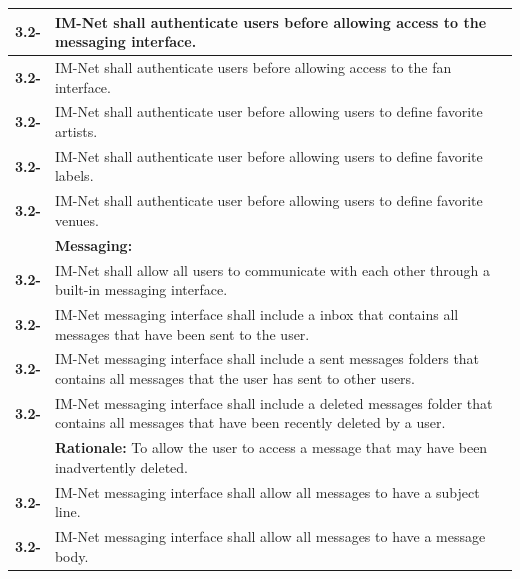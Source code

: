 \documentclass[letterpaper,12pt]{article}
\newcounter{rcounter}						%
\newcommand\rnumber{\stepcounter{rcounter}\arabic{rcounter}}
\begin{document}
{\begin{center}
\begin{tabular}{|l|p{6in}|}
\hline 
\textbf{3.2-\rnumber} & IM-Net shall authenticate users before allowing access to the messaging interface. \\ 
\hline 
\textbf{3.2-\rnumber} & IM-Net shall authenticate users before allowing access to the fan interface. \\ 
\hline 
\textbf{3.2-\rnumber} & IM-Net shall authenticate user before allowing users to define favorite artists. \\ 
\hline 
\textbf{3.2-\rnumber} & IM-Net shall authenticate user before allowing users to define favorite labels. \\ 
\hline 
\textbf{3.2-\rnumber} & IM-Net shall authenticate user before allowing users to define favorite venues. \\ 
\hline 
& \textbf{Messaging:} \\
\hline
\textbf{3.2-\rnumber} & IM-Net shall allow all users to communicate with each other through a built-in messaging interface. \\ 
\hline 
\textbf{3.2-\rnumber} & IM-Net messaging interface shall include a inbox that contains all messages that have been sent to the user. \\ 
\hline 
\textbf{3.2-\rnumber} & IM-Net messaging interface shall include a sent messages folders that contains all messages that the user has sent to other users.  \\ 
\hline 
\textbf{3.2-\rnumber} & IM-Net messaging interface shall include a deleted messages folder that contains all messages that have been recently deleted by a user. \\ 
& \textbf{Rationale:} To allow the user to access a message that may have been inadvertently deleted. \\
\hline 
\textbf{3.2-\rnumber} & IM-Net messaging interface shall allow all messages to have a subject line. \\ 
\hline 
\textbf{3.2-\rnumber} & IM-Net messaging interface shall allow all messages to have a message body.  \\ 
\hline 



\end{tabular} 
\end{center}

}
\end{document}
